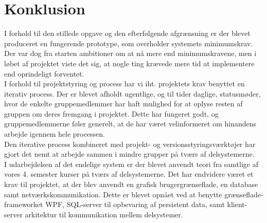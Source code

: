\chapter{Konklusion}
I forhold til den stillede opgave og den efterfølgende afgrænsning er der blevet produceret en fungerende prototype, som overholder systemets minimumskrav. Der var dog fra starten ambitioner om at nå mere end minimumskravene, men i løbet af projektet viste det sig, at nogle ting krævede mere tid at implementere end oprindeligt forventet.\\

I forhold til projektstyring og process har vi iht. projektets krav benyttet en iterativ process. Der er blevet afholdt ugentlige, og til tider daglige, statusmøder, hvor de enkelte gruppemedlemmer har haft mulighed for at oplyse resten af gruppen om deres fremgang i projektet. Dette har fungeret godt, og gruppemedlemmerne føler generelt, at de har været velinformeret om hinandens arbejde igennem hele processen.\\

Den iterative process kombineret med projekt- og versionsstyringsværktøjer har gjort det nemt at arbejde sammen i mindre grupper på tværs af delsystemerne.\\

I udarbejdelsen af det endelige system er der blevet anvendt teori fra samtlige af vores 4. semester kurser på tværs af delsystemerne. Det har endvidere været et krav til projektet, at der blev anvendt en grafisk brugergrænseflade, en database samt netværkskommunikation. Dette er blevet opnået ved at benytte grænseflade-frameworket WPF, SQL-server til opbevaring af persistent data, samt klient-server arkitektur til kommunikation mellem delsystemer.\\